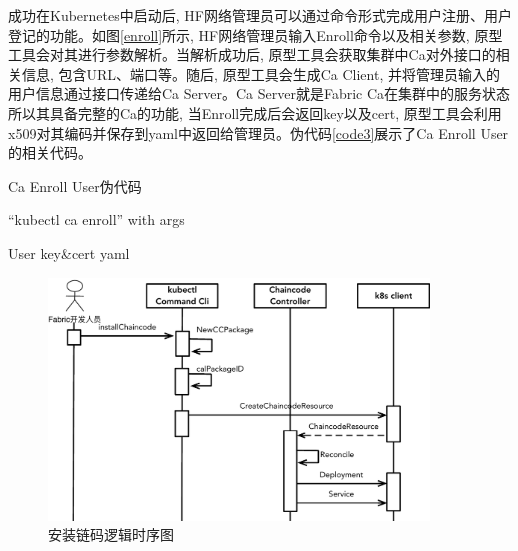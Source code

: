 成功在Kubernetes中启动后, HF网络管理员可以通过命令形式完成用户注册、用户登记的功能。如图\ref{enroll}所示, HF网络管理员输入Enroll命令以及相关参数, 原型工具会对其进行参数解析。当解析成功后, 原型工具会获取集群中Ca对外接口的相关信息, 包含URL、端口等。随后, 原型工具会生成Ca Client, 并将管理员输入的用户信息通过接口传递给Ca Server。Ca Server就是Fabric Ca在集群中的服务状态所以其具备完整的Ca的功能, 当Enroll完成后会返回key以及cert, 原型工具会利用x509对其编码并保存到yaml中返回给管理员。伪代码\ref{code3}展示了Ca Enroll User的相关代码。


\begin{algorithm}[!htbp]
    \caption{\footnotesize Ca Enroll User伪代码}
    \label{code3}
    {\footnotesize
    \begin{algorithmic}
        \renewcommand{\algorithmicrequire}{ \textbf{Input:}}
        \REQUIRE  
        “kubectl ca enroll” with args

        \renewcommand{\algorithmicensure}{\textbf{Output:}}
        \ENSURE
        User key\&cert yaml



 

        \STATE{\})}


    \end{algorithmic}
    }
\end{algorithm}


\begin{figure}[!htbp] %
    \centering %
    \includegraphics[width=0.9\textwidth]{FIGs/chapter5/installcc.pdf} %
    \caption{安装链码逻辑时序图} %
    \label{installcc} %
\end{figure}%


